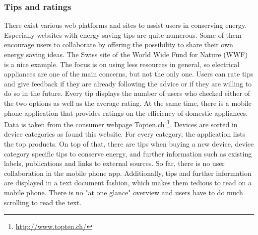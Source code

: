 \subsubsection{Tips and ratings}
There exist various web platforms and sites to assist users in conserving energy. Especially websites with energy saving tips are quite numerous. Some of them encourage users to collaborate by offering the possibility to share their own energy saving ideas. The Swiss site of the World Wide Fund for Nature (WWF)~\cite{wwf} is a nice example. The focus is on using less resources in general, so electrical appliances are one of the main concerns, but not the only one. Users can rate tips and give feedback if they are already following the advice or if they are willing to do so in the future. Every tip displays the number of users who checked either of the two options as well as the average rating. At the same time, there is a mobile phone application that provides ratings on the efficiency of domestic appliances. Data is taken from the consumer webpage Topten.ch \footnote{\url{http://www.topten.ch/}}. Devices are sorted in device categories as found this website. For every category, the application lists the top products. On top of that, there are tips when buying a new device, device category specific tips to conserve energy, and further information such as existing labels, publications and links to external sources. So far, there is no user collaboration in the mobile phone app. Additionally, tips and further information are displayed in a text document fashion, which makes them tedious to read on a mobile phone. There is no "at one glance" overview and users have to do much scrolling to read the text.   

